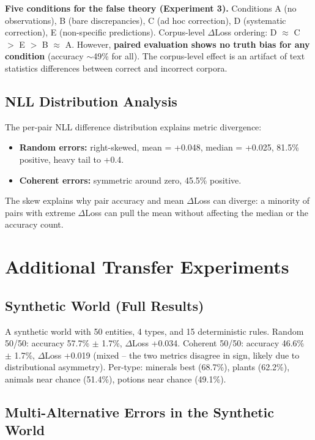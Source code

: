 \documentclass[10pt]{article} %
\begin{document}
\textbf{Five conditions for the false theory (Experiment 3).} Conditions A (no observations), B (bare discrepancies), C (ad hoc correction), D (systematic correction), E (non-specific predictions). Corpus-level $\Delta$Loss ordering: D $\approx$ C $>$ E $>$ B $\approx$ A. However, \textbf{paired evaluation shows no truth bias for any condition} (accuracy ${\sim}$49\% for all). The corpus-level effect is an artifact of text statistics differences between correct and incorrect corpora.

\subsection{NLL Distribution Analysis}

The per-pair NLL difference distribution explains metric divergence:
\begin{itemize}
    \item \textbf{Random errors:} right-skewed, mean = +0.048, median = +0.025, 81.5\% positive, heavy tail to +0.4.
    \item \textbf{Coherent errors:} symmetric around zero, 45.5\% positive.
\end{itemize}

The skew explains why pair accuracy and mean $\Delta$Loss can diverge: a minority of pairs with extreme $\Delta$Loss can pull the mean without affecting the median or the accuracy count.

\section{Additional Transfer Experiments}
\label{app:transfer}

\subsection{Synthetic World (Full Results)}

A synthetic world with 50 entities, 4 types, and 15 deterministic rules. Random 50/50: accuracy 57.7\% $\pm$ 1.7\%, $\Delta$Loss +0.034. Coherent 50/50: accuracy 46.6\% $\pm$ 1.7\%, $\Delta$Loss +0.019 (mixed -- the two metrics disagree in sign, likely due to distributional asymmetry). Per-type: minerals best (68.7\%), plants (62.2\%), animals near chance (51.4\%), potions near chance (49.1\%).

\subsection{Multi-Alternative Errors in the Synthetic World}
\end{document}
